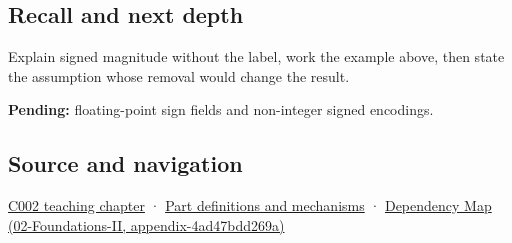 \subsection{Recall and next depth}\label{recall-and-next-depth}

Explain signed magnitude without the label, work the example above, then state the assumption whose removal would change the result.

\textbf{Pending:} floating-point sign fields and non-integer signed encodings.

\subsection{Source and navigation}\label{source-and-navigation}

\href{Continuous\%20Notes/Computing\%20Foundations\%20-\%20From\%20Bits\%20to\%20C++\%20and\%20Systems\%20APIs\#Arithmetic\%20becomes\%20a\%20policy}{C002 teaching chapter} · \hyperref[appendix-fd090d982a15]{Part definitions and mechanisms} · \href{}{Dependency Map (02-Foundations-II, appendix-4ad47bdd269a)}
